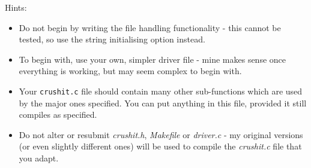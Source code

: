 \begin{exercise}
\noindent Hints:
\begin{itemize}
\item Do not begin by writing the file handling functionality -
this cannot be tested, so use the string initialising option
instead.
\item To begin with, use your own, simpler driver file - mine
makes sense once everything is working, but may seem complex
to begin with.
\item Your \verb^crushit.c^ file should contain many other sub-functions
which are used by the major ones specified. You can put anything in this
file, provided it still compiles as specified.
\item Do not alter or resubmit {\em crushit.h}, {\em Makefile} or
{\em driver.c} - my original versions (or even slightly different
ones) will be used to compile the {\em crushit.c} file that you adapt.
\end{itemize}

\end{exercise}

